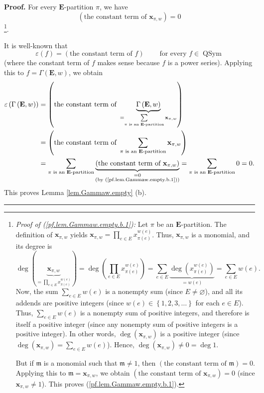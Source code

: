 \documentclass[numbers=enddot,12pt,final,onecolumn,notitlepage,abstracton]{scrartcl}
\theoremstyle{definition}
\newenvironment{proof}[1][Proof]{\noindent\textbf{#1.} }{\ \rule{0.5em}{0.5em}}
\let\sumnonlimits\sum
\let\prodnonlimits\prod
\renewcommand{\sum}{\sumnonlimits\limits}
\renewcommand{\prod}{\prodnonlimits\limits}
\newenvironment{verlong}{}{}
\begin{document}
\begin{verlong}
\begin{footnotesize}
\begin{proof}
For every $\mathbf{E}$-partition $\pi$, we have%
\begin{equation}
\left(  \text{the constant term of }\mathbf{x}_{\pi,w}\right)  =0
\label{pf.lem.Gammaw.empty.b.1}%
\end{equation}
\footnote{\textit{Proof of (\ref{pf.lem.Gammaw.empty.b.1}):} Let $\pi$ be an
$\mathbf{E}$-partition. The definition of $\mathbf{x}_{\pi,w}$ yields
${\mathbf{x}}_{\pi,w}=\prod_{e\in E}x_{\pi\left(  e\right)  }^{w\left(
e\right)  }$. Thus, ${\mathbf{x}}_{\pi,w}$ is a monomial, and its degree is%
\[
\deg\left(  \underbrace{\mathbf{x}_{\pi,w}}_{=\prod_{e\in E}x_{\pi\left(
e\right)  }^{w\left(  e\right)  }}\right)  =\deg\left(  \prod_{e\in E}%
x_{\pi\left(  e\right)  }^{w\left(  e\right)  }\right)  =\sum_{e\in
E}\underbrace{\deg\left(  x_{\pi\left(  e\right)  }^{w\left(  e\right)
}\right)  }_{=w\left(  e\right)  }=\sum_{e\in E}w\left(  e\right)  .
\]
Now, the sum $\sum_{e\in E}w\left(  e\right)  $ is a nonempty sum (since
$E\neq\varnothing$), and all its addends are positive integers (since
$w\left(  e\right)  \in\left\{  1,2,3,\ldots\right\}  $ for each $e\in E$).
Thus, $\sum_{e\in E}w\left(  e\right)  $ is a nonempty sum of positive
integers, and therefore is itself a positive integer (since any nonempty sum
of positive integers is a positive integer). In other words, $\deg\left(
\mathbf{x}_{\pi,w}\right)  $ is a positive integer (since $\deg\left(
\mathbf{x}_{\pi,w}\right)  =\sum_{e\in E}w\left(  e\right)  $). Hence,
$\deg\left(  \mathbf{x}_{\pi,w}\right)  \neq0=\deg1$.
\par
But if $\mathfrak{m}$ is a monomial such that $\mathfrak{m}\neq1$, then
$\left(  \text{the constant term of }\mathfrak{m}\right)  =0$. Applying this
to $\mathfrak{m}=\mathbf{x}_{\pi,w}$, we obtain $\left(  \text{the constant
term of }\mathbf{x}_{\pi,w}\right)  =0$ (since $\mathbf{x}_{\pi,w}\neq1$).
This proves (\ref{pf.lem.Gammaw.empty.b.1}).}.

It is well-known that
\[
\varepsilon\left(  f\right)  =\left(  \text{the constant term of }f\right)
\ \ \ \ \ \ \ \ \ \ \text{for every }f\in\operatorname*{QSym}%
\]
(where the constant term of $f$ makes sense because $f$ is a power series).
Applying this to $f=\Gamma\left(  \mathbf{E},w\right)  $, we obtain%
\begin{align*}
\varepsilon\left(  \Gamma\left(  \mathbf{E},w\right)  \right)   &  =\left(
\text{the constant term of }\underbrace{\Gamma\left(  \mathbf{E},w\right)
}_{=\sum_{\pi\text{ is an }{\mathbf{E}}\text{-partition}}{\mathbf{x}}_{\pi,w}%
}\right) \\
&  =\left(  \text{the constant term of }\sum_{\pi\text{ is an }{\mathbf{E}%
}\text{-partition}}{\mathbf{x}}_{\pi,w}\right) \\
&  =\sum_{\pi\text{ is an }{\mathbf{E}}\text{-partition}}\underbrace{\left(
\text{the constant term of }\mathbf{x}_{\pi,w}\right)  }%
_{\substack{=0\\\text{(by (\ref{pf.lem.Gammaw.empty.b.1}))}}}=\sum_{\pi\text{
is an }{\mathbf{E}}\text{-partition}}0=0.
\end{align*}
This proves Lemma \ref{lem.Gammaw.empty} (b).
\end{proof}


\end{footnotesize}
\end{verlong}
\end{document}
